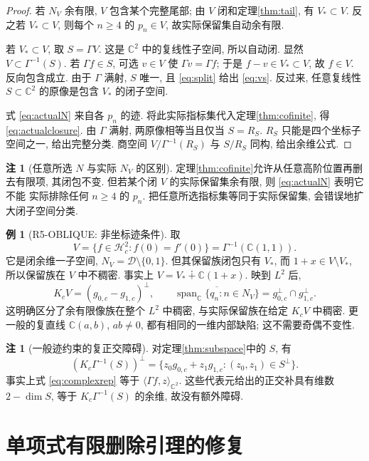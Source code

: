 \documentclass[UTF8,fontset=fandol,11pt,a4paper]{ctexart}
\theoremstyle{definition}
\newtheorem{example}[theorem]{例}
\newtheorem{remark}[theorem]{注}
\newcommand{\C}{\mathbb C}
\newcommand{\Hc}{\mathcal H_c^2}
\newcommand{\spn}{\operatorname{span}_{\C}}
\begin{document}
\begin{proof}
若 $N_V$ 余有限, $V$ 包含某个完整尾部; 由 $V$ 闭和定理\ref{thm:tail},
有 $V_*\subset V$. 反之若 $V_*\subset V$, 则每个 $n\ge4$ 的 $p_n\in V$,
故实际保留集自动余有限.

若 $V_*\subset V$, 取 $S=\Gamma V$.
这是 $\C^2$ 中的复线性子空间, 所以自动闭.
显然 $V\subset\Gamma^{-1}(S)$.
若 $\Gamma f\in S$, 可选 $v\in V$ 使 $\Gamma v=\Gamma f$;
于是 $f-v\in V_*\subset V$, 故 $f\in V$. 反向包含成立.
由于 $\Gamma$ 满射, $S$ 唯一, 且 \eqref{eq:split} 给出 \eqref{eq:vs}.
反过来, 任意复线性 $S\subset\C^2$ 的原像是包含 $V_*$ 的闭子空间.

式 \eqref{eq:actualN} 来自各 $p_n$ 的迹.
将此实际指标集代入定理\ref{thm:cofinite}, 得 \eqref{eq:actualclosure}.
由 $\Gamma$ 满射, 两原像相等当且仅当 $S=R_S$.
$R_S$ 只能是四个坐标子空间之一, 给出完整分类.
商空间 $V/\Gamma^{-1}(R_S)$ 与 $S/R_S$ 同构, 给出余维公式.
\end{proof}

\begin{remark}[任意所选 $N$ 与实际 $N_V$ 的区别]
定理\ref{thm:cofinite}允许从任意高阶位置再删去有限项, 其闭包不变.
但若某个闭 $V$ 的实际保留集余有限, 则 \eqref{eq:actualN} 表明它不能
实际排除任何 $n\ge4$ 的 $p_n$. 把任意所选指标集等同于实际保留集,
会错误地扩大闭子空间分类.
\end{remark}

\begin{example}[R5-OBLIQUE: 非坐标迹条件]\label{ex:oblique}
取
\[
V=\{f\in\Hc:f(0)=f'(0)\}=\Gamma^{-1}(\C(1,1)).
\]
它是闭余维一子空间, $N_V=\mathcal D\setminus\{0,1\}$.
但其保留族闭包只有 $V_*$, 而
$1+x\in V\setminus V_*$, 所以保留族在 $V$ 中不稠密.
事实上 $V=V_*\mathbin{\dotplus}\C(1+x)$.
映到 $L^2$ 后,
\[
K_cV=(g_{0,c}-g_{1,c})^\perp,\qquad
\overline{\spn\{q_n:n\in N_V\}}=g_{0,c}^\perp\cap g_{1,c}^\perp.
\]
这明确区分了余有限像族在整个 $L^2$ 中稠密, 与实际保留族在给定 $K_cV$ 中稠密.
更一般的复直线 $\C(a,b)$, $ab\ne0$, 都有相同的一维内部缺陷;
这不需要奇偶不变性.
\end{example}

\begin{remark}[一般迹约束的复正交障碍]
对定理\ref{thm:subspace}中的 $S$, 有
\[
(K_c\Gamma^{-1}(S))^\perp
=\{z_0g_{0,c}+z_1g_{1,c}:(z_0,z_1)\in S^\perp\}.
\]
事实上式 \eqref{eq:complexrep} 等于 $\langle\Gamma f,z\rangle_{\C^2}$.
这些代表元给出的正交补具有维数 $2-\dim S$, 等于
$K_c\Gamma^{-1}(S)$ 的余维, 故没有额外障碍.
\end{remark}

\section{单项式有限删除引理的修复}
\label{sec:monomials}
\end{document}
